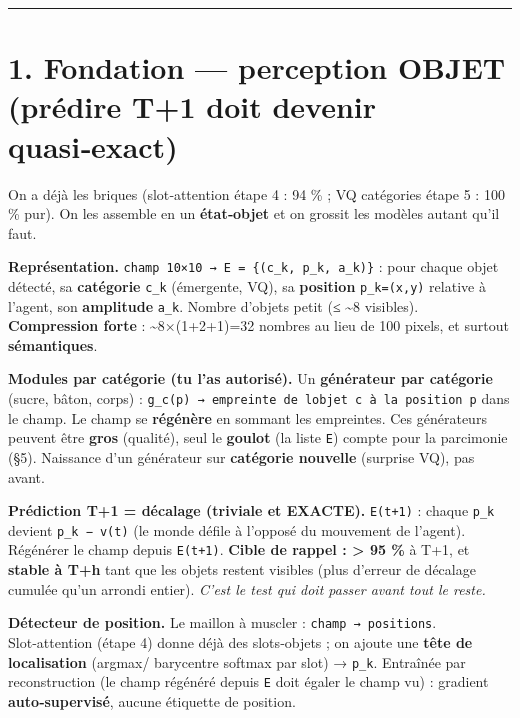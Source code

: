 \documentclass[
  french,
  11pt,
]{article}
\begin{document}
\begin{center}\rule{0.5\linewidth}{0.5pt}\end{center}

\section{1. Fondation --- perception OBJET (prédire T+1 doit devenir
quasi‑exact)}\label{fondation-perception-objet-pruxe9dire-t1-doit-devenir-quasiexact}

On a déjà les briques (slot‑attention étape 4 : 94 \% ; VQ catégories
étape 5 : 100 \% pur). On les assemble en un \textbf{état‑objet} et on
grossit les modèles autant qu'il faut.

\textbf{Représentation.}
\texttt{champ\ 10×10\ →\ E\ =\ \{(c\_k,\ p\_k,\ a\_k)\}} : pour chaque
objet détecté, sa \textbf{catégorie} \texttt{c\_k} (émergente, VQ), sa
\textbf{position} \texttt{p\_k=(x,y)} relative à l'agent, son
\textbf{amplitude} \texttt{a\_k}. Nombre d'objets petit (≤
\textasciitilde8 visibles). \textbf{Compression forte} :
\textasciitilde8×(1+2+1)=32 nombres au lieu de 100 pixels, et surtout
\textbf{sémantiques}.

\textbf{Modules par catégorie (tu l'as autorisé).} Un \textbf{générateur
par catégorie} (sucre, bâton, corps) :
\texttt{g\_c(p)\ →\ empreinte\ de\ l\textquotesingle{}objet\ c\ à\ la\ position\ p}
dans le champ. Le champ se \textbf{régénère} en sommant les empreintes.
Ces générateurs peuvent être \textbf{gros} (qualité), seul le
\textbf{goulot} (la liste \texttt{E}) compte pour la parcimonie (§5).
Naissance d'un générateur sur \textbf{catégorie nouvelle} (surprise VQ),
pas avant.

\textbf{Prédiction T+1 = décalage (triviale et EXACTE).} \texttt{E(t+1)}
: chaque \texttt{p\_k} devient \texttt{p\_k\ −\ v(t)} (le monde défile à
l'opposé du mouvement de l'agent). Régénérer le champ depuis
\texttt{E(t+1)}. \textbf{Cible de rappel : \textgreater{} 95 \%} à T+1,
et \textbf{stable à T+h} tant que les objets restent visibles (plus
d'erreur de décalage cumulée qu'un arrondi entier). \emph{C'est le test
qui doit passer avant tout le reste.}

\textbf{Détecteur de position.} Le maillon à muscler :
\texttt{champ\ →\ positions}. Slot‑attention (étape 4) donne déjà des
slots‑objets ; on ajoute une \textbf{tête de localisation} (argmax/
barycentre softmax par slot) → \texttt{p\_k}. Entraînée par
reconstruction (le champ régénéré depuis \texttt{E} doit égaler le champ
vu) : gradient \textbf{auto‑supervisé}, aucune étiquette de position.
\end{document}
